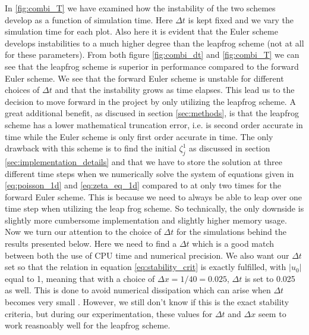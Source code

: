 \documentclass[12pt]{article}
\numberwithin{figure}{section}
\numberwithin{table}{section}
\begin{document}
\noindent In \ref{fig:combi_T} we have examined how the instability of the two schemes develop as a function of simulation time. Here $\Delta t$ is kept fixed and we vary the simulation time for each plot. Also here it is evident that the Euler scheme develops instabilities to a much higher degree than the leapfrog scheme (not at all for these parameters). From both figure \ref{fig:combi_dt} and \ref{fig:combi_T} we can see that the leapfrog scheme is superior in performance compared to the forward Euler scheme. We see that the forward Euler scheme is unstable for different choices of $\Delta t$ and that the instability grows as time elapses. This lead us to the decision to move forward in the project by only utilizing the leapfrog scheme. A great additional benefit, as discused in section \ref{sec:methods}, is that the leapfrog scheme has a lower mathematical truncation error, i.e. is second order accurate in time while the Euler scheme is only first order accurate in time. The only drawback with this scheme is to find the initial $\zeta_j^1$ as discussed in section \ref{sec:implementation_details} and that we have to store the solution at three different time steps when we numerically solve the system of equations given in \eqref{eq:poisson_1d} and \eqref{eq:zeta_eq_1d} compared to at only two times for the forward Euler scheme. This is because we need to always be able to leap over one time step when utilizing the leap frog scheme. So technically, the only downside is slightly more cumbersome implementation and slightly higher memory usage. \\
 

\noindent Now we turn our attention to the choice of $\Delta t$ for the simulations behind the results presented below. Here we need to find a $\Delta t$ which is a good match between both the use of CPU time and numerical precision. We also want our $\Delta t$ set so that the relation in equation \eqref{eq:stability_crit} is exactly fulfilled, with $ |u_0| $ equal to 1, meaning that with a choice of $\Delta x=1/40=0.025$, $\Delta t$ is set to 0.025 as well. This is done to avoid numerical dissipation which can arise when $\Delta t$ becomes very small \cite{lars_petter}. However, we still don't know if this is the exact stability criteria, but during our experimentation, these values for $\Delta t$ and $\Delta x$ seem to work reasnoably well for the leapfrog scheme.\\

\end{document}
